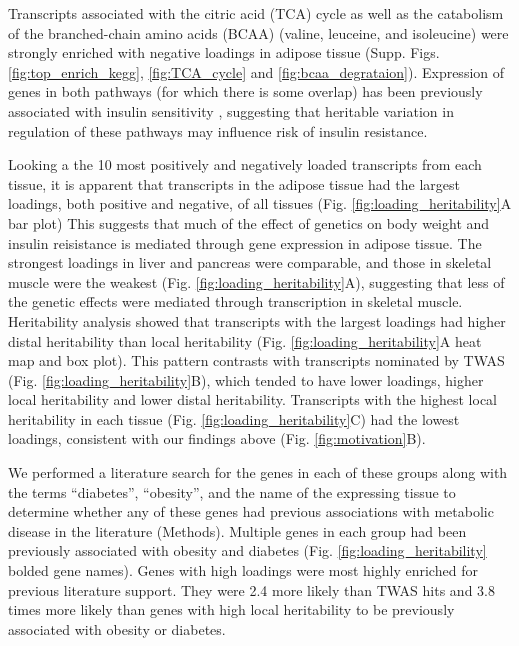 \documentclass[
]{article}
\begin{document}
Transcripts associated with the citric acid (TCA) cycle as well as the
catabolism of the branched-chain amino acids (BCAA) (valine, leuceine,
and isoleucine) were strongly enriched with negative loadings in adipose
tissue (Supp. Figs. \ref{fig:top_enrich_kegg}, \ref{fig:TCA_cycle} and
\ref{fig:bcaa_degrataion}). Expression of genes in both pathways (for
which there is some overlap) has been previously associated with insulin
sensitivity \cite{pmid29567659, 
pmid22560213, pmid19841271}, suggesting that heritable variation in
regulation of these pathways may influence risk of insulin resistance.

Looking a the 10 most positively and negatively loaded transcripts from
each tissue, it is apparent that transcripts in the adipose tissue had
the largest loadings, both positive and negative, of all tissues (Fig.
\ref{fig:loading_heritability}A bar plot) This suggests that much of the
effect of genetics on body weight and insulin reisistance is mediated
through gene expression in adipose tissue. The strongest loadings in
liver and pancreas were comparable, and those in skeletal muscle were
the weakest (Fig. \ref{fig:loading_heritability}A), suggesting that less
of the genetic effects were mediated through transcription in skeletal
muscle. Heritability analysis showed that transcripts with the largest
loadings had higher distal heritability than local heritability (Fig.
\ref{fig:loading_heritability}A heat map and box plot). This pattern
contrasts with transcripts nominated by TWAS (Fig.
\ref{fig:loading_heritability}B), which tended to have lower loadings,
higher local heritability and lower distal heritability. Transcripts
with the highest local heritability in each tissue (Fig.
\ref{fig:loading_heritability}C) had the lowest loadings, consistent
with our findings above (Fig. \ref{fig:motivation}B).

We performed a literature search for the genes in each of these groups
along with the terms ``diabetes'', ``obesity'', and the name of the
expressing tissue to determine whether any of these genes had previous
associations with metabolic disease in the literature (Methods).
Multiple genes in each group had been previously associated with obesity
and diabetes (Fig. \ref{fig:loading_heritability} bolded gene names).
Genes with high loadings were most highly enriched for previous
literature support. They were 2.4 more likely than TWAS hits and 3.8
times more likely than genes with high local heritability to be
previously associated with obesity or diabetes.
\end{document}
